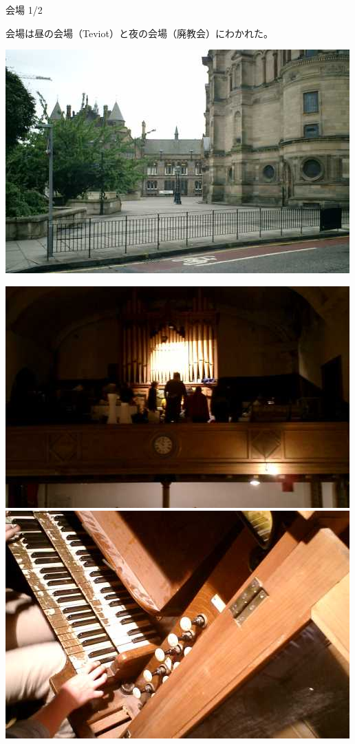 \documentclass[cjk,dvipdfmx,12pt]{beamer}
\begin{document}
\begin{frame}{会場 1/2}
\begin{minipage}{0.49\hsize}
 会場は昼の会場（Teviot）と夜の会場（廃教会）にわかれた。

  \includegraphics[width=1\hsize]{image200707/teviot.jpg}
\end{minipage}
\begin{minipage}{0.49\hsize}
  \includegraphics[width=1\hsize]{image200707/nightvenue1.jpg}\\
  \includegraphics[width=1\hsize]{image200707/nightvenue2.jpg}
\end{minipage}
\end{frame}
\end{document}
